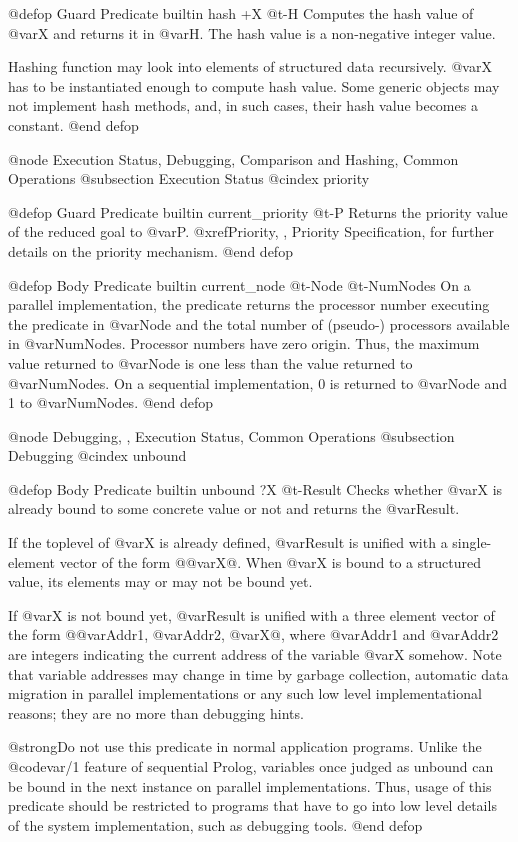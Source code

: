 {@defop {Guard Predicate} {builtin} hash +X @t{-}H
Computes the hash value of @var{X} and returns it in @var{H}.  The hash
value is a non-negative integer value.

Hashing function may look into elements of structured data recursively.
@var{X} has to be instantiated enough to compute hash value.  Some
generic objects may not implement hash methods, and, in such cases,
their hash value becomes a constant.
@end defop

@node Execution Status, Debugging, Comparison and Hashing, Common Operations
@subsection Execution Status
@cindex priority

@defop {Guard Predicate} {builtin} current_priority @t{-}P
Returns the priority value of the reduced goal to @var{P}.
@xref{Priority, , Priority Specification}, for further details on the
priority mechanism.
@end defop

@defop {Body Predicate} {builtin} current_node @t{-}Node @t{-}NumNodes
On a parallel implementation, the predicate returns the processor number
executing the predicate in @var{Node} and the total number of (pseudo-)
processors available in @var{NumNodes}.  Processor numbers have zero
origin.  Thus, the maximum value returned to @var{Node} is one less than
the value returned to @var{NumNodes}.  On a sequential implementation, 0
is returned to @var{Node} and 1 to @var{NumNodes}.
@end defop

@node Debugging,  , Execution Status, Common Operations
@subsection Debugging
@cindex unbound

@defop {Body Predicate} {builtin} unbound ?X @t{-}Result
Checks whether @var{X} is already bound to some concrete value or not
and returns the @var{Result}.

If the toplevel of @var{X} is already defined, @var{Result} is unified
with a single-element vector of the form @{@var{X}@}.  When @var{X} is
bound to a structured value, its elements may or may not be bound
yet.

If @var{X} is not bound yet, @var{Result} is unified with a three
element vector of the form @{@var{Addr1}, @var{Addr2}, @var{X}@}, where
@var{Addr1} and @var{Addr2} are integers indicating the current address
of the variable @var{X} somehow.  Note that variable addresses may
change in time by garbage collection, automatic data migration in
parallel implementations or any such low level implementational reasons;
they are no more than debugging hints.

@strong{Do not use this predicate in normal application programs.}
Unlike the @code{var/1} feature of sequential Prolog, variables once
judged as unbound can be bound in the next instance on parallel
implementations.  Thus, usage of this predicate should be restricted to
programs that have to go into low level details of the system
implementation, such as debugging tools.
@end defop

}
